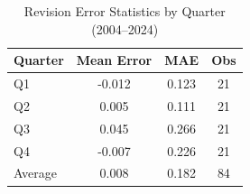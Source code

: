 \begin{table}[t]
\centering
\caption{Revision Error Statistics by Quarter (2004--2024)}
\label{tab:revision_errors}
\begin{tabular}{lccc}
\toprule
Quarter & Mean Error & MAE & Obs \\
\midrule
Q1 & -0.012 & 0.123 & 21 \\
Q2 & 0.005 & 0.111 & 21 \\
Q3 & 0.045 & 0.266 & 21 \\
Q4 & -0.007 & 0.226 & 21 \\
Average & 0.008 & 0.182 & 84 \\
\bottomrule
\end{tabular}
\end{table}
